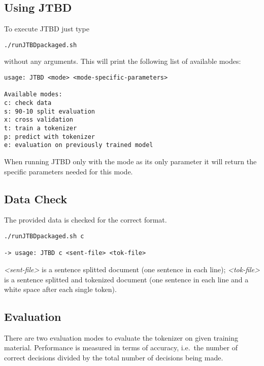 \documentclass[11pt,a4paper,halfparskip]{scrartcl}
\begin{document}
\subsection{Using JTBD}

To execute JTBD just type 

\begin{verbatim}
./runJTBDpackaged.sh
\end{verbatim}

without any arguments. This will print the following list of available
modes:

\begin{verbatim}
usage: JTBD <mode> <mode-specific-parameters>

Available modes:
c: check data 
s: 90-10 split evaluation
x: cross validation 
t: train a tokenizer 
p: predict with tokenizer 
e: evaluation on previously trained model
\end{verbatim}

When running JTBD only with the mode as its only parameter it will
return the specific parameters needed for this mode.

\subsection{Data Check}

The provided data is checked for the correct format.

\begin{verbatim}
./runJTBDpackaged.sh c

-> usage: JTBD c <sent-file> <tok-file>
\end{verbatim}

\textit{<sent-file>} is a sentence splitted document (one sentence in
each line); \textit{<tok-file>} is a sentence splitted and tokenized
document (one sentence in each line and a white space after each
single token).

\subsection{Evaluation}

There are two evaluation modes to evaluate the tokenizer on given
training material. Performance is measured in terms of accuracy, i.e.\
the number of correct decisions divided by the total number of
decisions being made.
\end{document}
